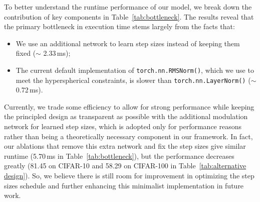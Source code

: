 To better understand the runtime performance of our model, we break down the contribution of key components in Table~\ref{tab:bottleneck}. The results reveal that the primary bottleneck in execution time stems largely from the facts that:
\begin{itemize}[leftmargin=*]
    \item We use an additional network to learn step sizes instead of keeping them fixed ($\sim$ 2.33\,ms);
    \item The current default implementation of \texttt{torch.nn.RMSNorm()}, which we use to meet the hyperspherical constraints, is slower than \texttt{torch.nn.LayerNorm()} ($\sim$ 0.72\,ms).
\end{itemize}

Currently, we trade some efficiency to allow for strong performance while keeping the principled design as transparent as possible with the additional modulation network for learned step sizes, which is adopted only for performance reasons rather than being a theoretically necessary component in our framework. In fact, our ablations that remove this extra network and fix the step sizes give similar runtime (5.70\,ms in Table~\ref{tab:bottleneck}), but the performance decreases greatly (81.45 on CIFAR-10 and 58.29 on CIFAR-100 in Table~\ref{tab:alternative design}). So, we believe there is still room for improvement in optimizing the step sizes schedule and further enhancing this minimalist implementation in future work.


